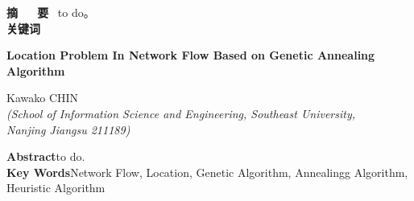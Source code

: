 \documentclass[a4paper,11pt,onecolumn,twoside]{article}
\title{\huge \heiti{基于遗传退火算法的网络流选址问题}}
\author{{\Large \fangsong 袁瑞} \\[2pt]
\footnotesize
（东南大学信息科学与工程学院，南京市~211189） \\[2pt]}
\date{}
\begin{document}
\newcommand{\supercite}[1]{\textsuperscript{\cite{#1}}}%
\maketitle

\setlength{\oddsidemargin}{1cm} %
\setlength{\evensidemargin}{\oddsidemargin}
\setlength{\textwidth}{13.50cm}
\vspace{-.8cm}
\begin{center}
	\parbox{\textwidth}
	{\textbf{摘~~~要} \quad ~{\kaishu  to do。}\\
	\textbf{关键词} 
}
\end{center}

\vspace{.1cm}

\begin{center}
\parbox{\textwidth}{
	\begin{center}
	{\Large{\textbf{Location Problem In Network Flow Based on Genetic Annealing Algorithm}}}
	\end{center}

	\vspace{-0.5cm}
	
	\begin{center}
		Kawako CHIN \\[2pt]
		\scriptsize{\textit{(School of Information Science and Engineering, Southeast University,\\ Nanjing Jiangsu 211189)}}\\[2pt]
	\end{center}

	{\small{\textbf{Abstract}\quad to do.\\
	\textbf{Key Words}\quad Network Flow, Location, Genetic Algorithm, Annealingg Algorithm, Heuristic Algorithm}}
}
\end{center}
\end{document}

